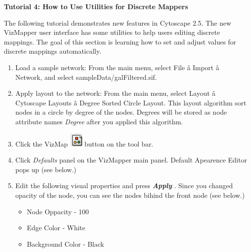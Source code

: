  
\textbf{Tutorial 4: How to Use Utilities for Discrete Mappers}


 The following tutorial demonstrates new features in Cytoscape 2.5. The new VizMapper user interface has some utilities to help users editing discrete mappings. The goal of this section is learning how to set and adjust values for discrete mappings automatically. 
\begin{enumerate}
\item 

 Load a sample network: From the main menu, select File \^a Import \^a Network, and select sampleData/galFiltered.sif. 

\item 

 Apply layout to the network: From the main menu, select Layout \^a Cytoscape Layouts \^a Degree Sorted Circle Layout. This layout algorithm sort nodes in a circle by degree of the nodes. Degrees will be stored as node attribute names \emph{Degree}
 after you applied this algorithm. 

\item 

 Click the VizMap \includegraphics[width=.6\textwidth]{images/VizMapIcon.png}  button on the tool bar. 

\item 

 Click \emph{Defaults}
 panel on the VizMapper main panel. Default Apearence Editor pops up (see below.) 

\item 

 Edit the following visual properties and press \emph{\textbf{Apply}
}
. Since you changed opacity of the node, you can see the nodes bihind the front node (see below.) 
\begin{itemize}
\item Node Oppacity - 100 
\item Edge Color - White 
\item Background Color - Black 


\end{itemize}
\end{enumerate}
